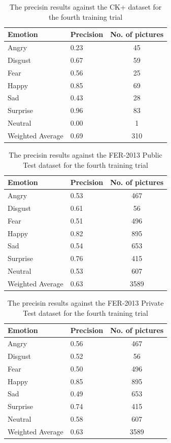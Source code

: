 \documentclass[runningheads,a4paper,11pt]{report}
\begin{document}
\begin{table}[htbp]
	\caption{The precisin results against the CK+ dataset for the fourth training trial}
	\label{fer_training_28k_001_mean_square_ckp}
		\begin{center}
			\begin{tabular}{p{110pt}p{110pt}c}
				\textbf{Emotion}& \textbf{Precision}& \textbf{No. of pictures} \\
				\hline\hline
				Angry& 0.23& 45 \\
				Disgust& 0.67& 59 \\
				Fear& 0.56& 25 \\
				Happy& 0.85& 69 \\
				Sad& 0.43& 28 \\
				Surprise& 0.96& 83 \\
				Neutral& 0.00& 1 \\
				\hline
				Weighted Average& 0.69& 310
			\end{tabular}
		\end{center}
\end{table}
\begin{table}[htbp]
	\caption{The precisin results against the FER-2013 Public Test dataset for the fourth training trial}
	\label{fer_training_28k_001_mean_square_public_test}
		\begin{center}
			\begin{tabular}{p{110pt}p{110pt}c}
				\textbf{Emotion}& \textbf{Precision}& \textbf{No. of pictures} \\
				\hline\hline
				Angry& 0.53& 467 \\
				Disgust& 0.61& 56 \\
				Fear& 0.51& 496 \\
				Happy& 0.82& 895 \\
				Sad& 0.54& 653 \\
				Surprise& 0.76& 415 \\
				Neutral& 0.53& 607 \\
				\hline
				Weighted Average& 0.63 &3589
			\end{tabular}
		\end{center}
\end{table}
\begin{table}[htbp]
	\caption{The precisin results against the FER-2013 Private Test dataset for the fourth training trial}
	\label{fer_training_28k_001_mean_square_private_test}
		\begin{center}
			\begin{tabular}{p{110pt}p{110pt}c}
				\textbf{Emotion}& \textbf{Precision}& \textbf{No. of pictures} \\
				\hline\hline
				Angry& 0.56& 467 \\
				Disgust& 0.52& 56 \\
				Fear& 0.50& 496 \\
				Happy& 0.85& 895 \\
				Sad& 0.49& 653 \\
				Surprise& 0.74& 415 \\
				Neutral& 0.58& 607 \\
				\hline
				Weighted Average& 0.63 &3589
			\end{tabular}
		\end{center}
\end{table}
\end{document}
